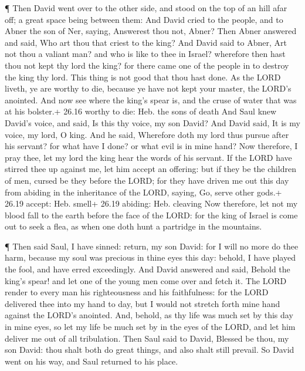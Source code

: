 ¶ Then David went over to the other side, and stood on the
top of an hill afar off; a great space being between them: 
And David cried to the people, and to Abner the son of Ner, saying,
Answerest thou not, Abner? Then Abner answered and said, Who art thou
that criest to the king?  And David said to Abner, Art not
thou a valiant man? and who is like to thee in Israel? wherefore then
hast thou not kept thy lord the king? for there came one of the people
in to destroy the king thy lord.  This thing is not good
that thou hast done. As the LORD liveth, ye are worthy to die, because
ye have not kept your master, the LORD's anointed. And now see where the
king's spear is, and the cruse of water that was at his bolster.+ 26.16
worthy to die: Heb. the sons of death  And Saul knew
David's voice, and said, Is this thy voice, my son David? And David
said, It is my voice, my lord, O king.  And he said,
Wherefore doth my lord thus pursue after his servant? for what have I
done? or what evil is in mine hand?  Now therefore, I pray
thee, let my lord the king hear the words of his servant. If the LORD
have stirred thee up against me, let him accept an offering: but if they
be the children of men, cursed be they before the LORD; for they have
driven me out this day from abiding in the inheritance of the LORD,
saying, Go, serve other gods.+ 26.19 accept: Heb. smell+ 26.19 abiding:
Heb. cleaving  Now therefore, let not my blood fall to the
earth before the face of the LORD: for the king of Israel is come out to
seek a flea, as when one doth hunt a partridge in the mountains.

 ¶ Then said Saul, I have sinned: return, my son David: for
I will no more do thee harm, because my soul was precious in thine eyes
this day: behold, I have played the fool, and have erred exceedingly.
 And David answered and said, Behold the king's spear! and
let one of the young men come over and fetch it.  The LORD
render to every man his righteousness and his faithfulness: for the LORD
delivered thee into my hand to day, but I would not stretch forth mine
hand against the LORD's anointed.  And, behold, as thy life
was much set by this day in mine eyes, so let my life be much set by in
the eyes of the LORD, and let him deliver me out of all tribulation.
 Then Saul said to David, Blessed be thou, my son David:
thou shalt both do great things, and also shalt still prevail. So David
went on his way, and Saul returned to his place.

